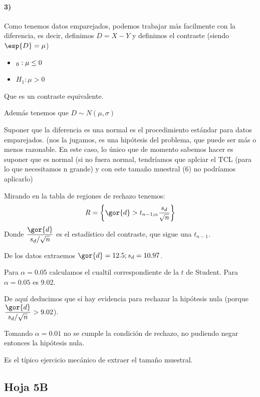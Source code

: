 \begin{problem}[6]
\paragraph{3)} Como tenemos datos emparejados, podemos trabajar más facilmente con la diferencia, es decir, definimos $D=X-Y$ y definimos el contraste (siendo $\esp{D}=\mu$)
\begin{itemize}
\item $\Huge_0 : \mu \leq 0$
\item $H_1: \mu >0$
\end{itemize}

Que es un contraste equivalente.

Además tenemos que $D \sim N(\mu,\sigma)$ 

Suponer que la diferencia es una normal es el procedimiento estándar para datos emparejados. (nos la jugamos, es una hipótesis del problema, que puede ser más o menos razonable. En este caso, lo único que de momento sabemos hacer es suponer que es normal (si no fuera normal, tendríamos que aplciar el TCL (para lo que necesitamos n grande) y con este tamaño muestral (6) no podríamos aplicarlo)

Mirando en la tabla de regiones de rechazo tenemos:
\[R = \left\{\gor{d}> t_{n-1;\alpha} \frac{s_d}{\sqrt{n}}\right\}\]
Donde $\displaystyle \frac{\gor{d}}{s_d/\sqrt{n}}$ es el estadístico del contraste, que sigue una $t_{n-1}$.

De los datos extraemos $\gor{d} = 12.5;s_d=10.97$.

Para $\alpha = 0.05$ calculamos el cualtil correspondiente de la $t$ de Student. Para $\alpha = 0.05$ es 9.02.

De aquí deducimos que sí hay evidencia para rechazar la hipótesis nula (porque  $\displaystyle \frac{\gor{d}}{s_d/\sqrt{n}} > 9.02$).

\spart Tomando $\alpha = 0.01$ no se cumple la condición de rechazo, no pudiendo negar entonces la hipótesis nula.

\spart Es el típico ejercicio mecánico de extraer el tamaño muestral.
\end{problem}

\subsection{Hoja 5B}

